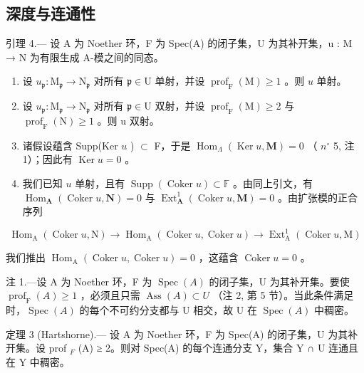 \subsection{深度与连通性}

引理 4.--- 设 A 为 Noether 环，F 为 Spec(A) 的闭子集，U 为其补开集，u : M → N 为有限生成 A-模之间的同态。

\begin{enumerate}
\def\labelenumi{\alph{enumi})}
\item
  设 \(u_{\mathfrak{p}}: \mathrm{M}_{\mathfrak{p}} \to \mathrm{N}_{\mathfrak{p}}\) 对所有 \(\mathfrak{p} \in \mathrm{U}\) 单射，并设 \(\operatorname{prof}_{\mathrm{F}}(\mathrm{M}) \geqslant 1\) 。则 \(u\) 单射。
\item
  设 \(u_{\mathfrak{p}}: \mathrm{M}_{\mathfrak{p}} \to \mathrm{N}_{\mathfrak{p}}\) 对所有 \(\mathfrak{p} \in \mathrm{U}\) 双射，并设 \(\operatorname{prof}_{\mathrm{F}}(\mathrm{M}) \geqslant 2\) 与 \(\operatorname{prof}_{\mathrm{F}}(\mathrm{N}) \geqslant 1\) 。则 u 双射。
\item
  诸假设蕴含 Supp(Ker \(u\) ) \(\subset\) F，于是 \(\operatorname{Hom}_{\Lambda}(\operatorname{Ker} u, \mathbf{M}) = 0\) （ \(n^{\circ}\) 5, 注 1）；因此有 \(\operatorname{Ker} u = 0\) 。
\item
  我们已知 \(u\) 单射，且有 \(\operatorname{Supp}(\operatorname{Coker} u) \subset \mathbb{F}\) 。由同上引文，有 \(\operatorname{Hom}_{\mathbf{A}}(\operatorname{Coker} u, \mathbf{N}) = 0\) 与 \(\operatorname{Ext}_{\mathbf{A}}^{1}(\operatorname{Coker} u, \mathbf{M}) = 0\) 。由扩张模的正合序列
\end{enumerate}

\[
\operatorname{Hom} _ {\mathrm{A}} (\operatorname{Coker} u, \mathrm{N}) \rightarrow \operatorname{Hom} _ {\mathrm{A}} (\operatorname{Coker} u, \operatorname{Coker} u) \rightarrow \operatorname{Ext} _ {\mathrm{A}} ^ {1} (\operatorname{Coker} u, \mathrm{M})
\]

我们推出 \(\operatorname{Hom}_{\mathrm{A}}(\operatorname{Coker} u, \operatorname{Coker} u) = 0\) ，这蕴含 \(\operatorname{Coker} u = 0\) 。

注 1.—设 A 为 Noether 环，F 为 \(\operatorname{Spec}(A)\) 的闭子集，U 为其补开集。要使 \(\operatorname{prof}_{\mathrm{F}}(A) \geqslant 1\) ，必须且只需 \(\operatorname{Ass}(A) \subset U\) （注 2, 第 5 节）。当此条件满足时，\(\operatorname{Spec}(A)\) 的每个不可约分支都与 U 相交，故 U 在 \(\operatorname{Spec}(A)\) 中稠密。

定理 3 (Hartshorne).--- 设 A 为 Noether 环，F 为 Spec(A) 的闭子集，U 为其补开集。设 prof \(_{F}\) (A) ≥ 2。则对 Spec(A) 的每个连通分支 Y，集合 Y ∩ U 连通且在 Y 中稠密。

